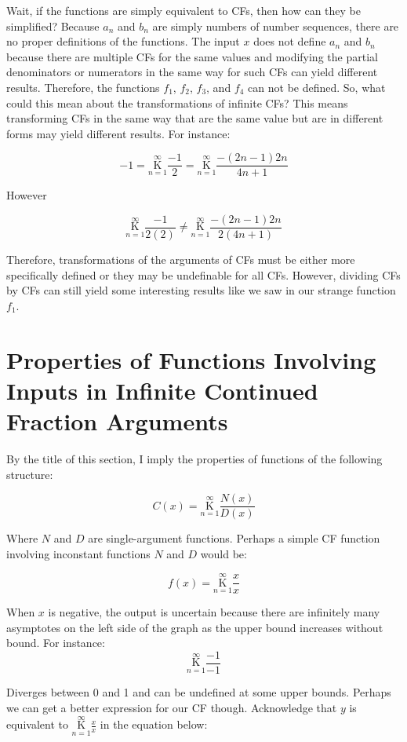 \documentclass{article}
\begin{document}
Wait, if the functions are simply equivalent to CFs, then how can they be simplified? Because $a_n$ and $b_n$ are simply numbers of number sequences, there are no proper definitions of the functions. The input $x$ does not define $a_n$ and $b_n$ because there are multiple CFs for the same values and modifying the partial denominators or numerators in the same way for such CFs can yield different results. Therefore, the functions $f_1$, $f_2$, $f_3$, and $f_4$ can not be defined. So, what could this mean about the transformations of infinite CFs? This means transforming CFs in the same way that are the same value but are in different forms may yield different results. For instance:

$$-1=\underset{n=1}{\overset{\infty}{\mathrm K}} \frac{-1}{2}=\underset{n=1}{\overset{\infty}{\mathrm K}} \frac{-(2n-1)2n}{4n+1}$$

However

$$\underset{n=1}{\overset{\infty}{\mathrm K}} \frac{-1}{2(2)} \neq \underset{n=1}{\overset{\infty}{\mathrm K}} \frac{-(2n-1)2n}{2(4n+1)}$$

Therefore, transformations of the arguments of CFs must be either more specifically defined or they may be undefinable for all CFs. However, dividing CFs by CFs can still yield some interesting results like we saw in our strange function $f_1$.

\section{Properties of Functions Involving Inputs in Infinite Continued Fraction Arguments}

By the title of this section, I imply the properties of functions of the following structure:

$$C(x)=\underset{n=1}{\overset{\infty}{\mathrm K}} \frac{N(x)}{D(x)}$$

Where $N$ and $D$ are single-argument functions. Perhaps a simple CF function involving inconstant functions $N$ and $D$ would be:

$$f(x)=\underset{n=1}{\overset{\infty}{\mathrm K}} \frac{x}{x}$$

When $x$ is negative, the output is uncertain because there are infinitely many asymptotes on the left side of the graph as the upper bound increases without bound. For instance:
$$\underset{n=1}{\overset{\infty}{\mathrm K}} \frac{-1}{-1}$$

Diverges between 0 and 1 and can be undefined at some upper bounds. Perhaps we can get a better expression for our CF though. Acknowledge that $y$ is equivalent to $\underset{n=1}{\overset{\infty}{\mathrm K}} \frac{x}{x}$ in the equation below:
\end{document}
